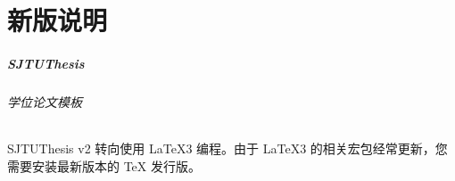 
\part{新版说明}

\begin{frame}
  \frametitle{SJTUThesis}
  \framesubtitle{学位论文模板}
  SJTUThesis v2 转向使用 \LaTeX3 编程。由于 \LaTeX3 的相关宏包经常更新，您需要安装最新版本的 \TeX{} 发行版。

  \begin{figure}
    \scriptsize
    \begin{columns}[c]
      \hfill
      \begin{column}{0.2\textwidth}
      \end{column}

\end{columns}
\end{figure}
\end{frame}
